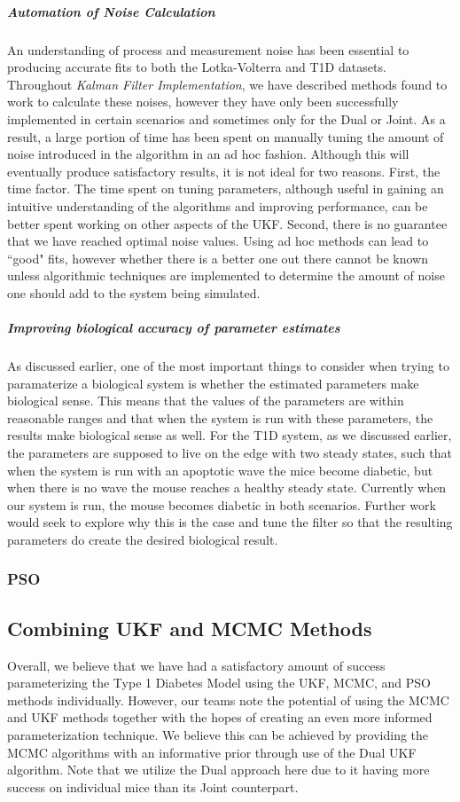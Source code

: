 \subparagraph{Automation of Noise Calculation}
An understanding of process and measurement noise has been essential to producing accurate fits to both the Lotka-Volterra and T1D datasets. Throughout \emph{Kalman Filter Implementation}, we have described methods found to work to calculate these noises, however they have only been successfully implemented in certain scenarios and sometimes only for the Dual or Joint. As a result, a large portion of time has been spent on manually tuning the amount of noise introduced in the algorithm in an ad hoc fashion. Although this will eventually produce satisfactory results, it is not ideal for two reasons. First, the time factor. The time spent on tuning parameters, although useful in gaining an intuitive understanding of the algorithms and improving performance, can be better spent working on other aspects of the UKF. Second, there is no guarantee that we have reached optimal noise values. Using ad hoc methods can lead to ``good" fits, however whether there is a better one out there cannot be known unless algorithmic techniques are implemented to determine the amount of noise one should add to the system being simulated.

\subparagraph{Improving biological accuracy of parameter estimates}
As discussed earlier, one of the most important things to consider when trying to paramaterize a biological system is whether the estimated parameters make biological sense. This means that the values of the parameters are within reasonable ranges and that when the system is run with these parameters, the results make biological sense as well. For the T1D system, as we discussed earlier, the parameters are supposed to live on the edge with two steady states, such that when the system is run with an apoptotic wave the mice become diabetic, but when there is no wave the mouse reaches a healthy steady state. Currently when our system is run, the mouse becomes diabetic in both scenarios. Further work would seek to explore why this is the case and tune the filter so that the resulting parameters do create the desired biological result. 

\subsubsection{PSO}


\subsection{Combining UKF and MCMC Methods} \label{Combining_UKF_MCMC}
Overall, we believe that we have had a satisfactory amount of success parameterizing the Type 1 Diabetes Model using the UKF, MCMC, and PSO methods individually. However, our teams note the potential of using the MCMC and UKF methods together with the hopes of creating an even more informed parameterization technique. We believe this can be achieved by providing the MCMC algorithms with an informative prior through use of the Dual UKF algorithm. Note that we utilize the Dual approach here due to it having more success on individual mice than its Joint counterpart. 


